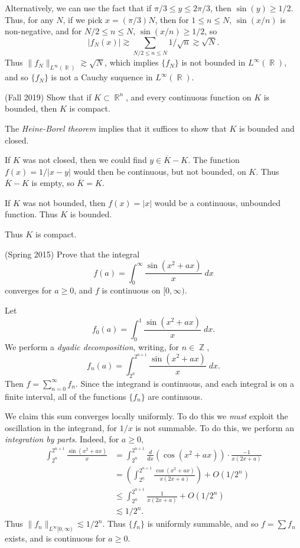 \documentclass{exam}
\DeclareMathOperator{\RR}{\mathbb{R}}
\DeclareMathOperator{\ZZ}{\mathbb{Z}}
\theoremstyle{problemstyle}
\newcommand{\1}[1]{\textbf{1}_{\left[#1\right]}} %
\begin{document}
\begin{questions}
\begin{parts}
\begin{solution}
		Alternatively, we can use the fact that if $\pi/3 \leq y \leq 2\pi/3$, then $\sin(y) \geq 1/2$. Thus, for any $N$, if we pick $x = (\pi/3)N$, then for $1 \leq n \leq N$, $\sin(x/n)$ is non-negative, and for $N/2 \leq n \leq N$, $\sin(x/n) \geq 1/2$, so
		\[ |f_N(x)| \gtrsim \sum_{N/2 \leq n \leq N} 1/\sqrt{n} \gtrsim \sqrt{N}. \]
		Thus $\| f_N \|_{L^\infty(\RR)} \gtrsim \sqrt{N}$, which implies $\{ f_N \}$ is not bounded in $L^\infty(\RR)$, and so $\{ f_N \}$ is not a Cauchy suquence in $L^\infty(\RR)$.
	\end{solution}
\end{parts}

\question (Fall 2019) Show that if $K \subset \RR^n$, and every continuous function on $K$ is bounded, then $K$ is compact.
\begin{solution}
	The \emph{Heine-Borel theorem} implies that it suffices to show that $K$ is bounded and closed.

	If $K$ was not closed, then we could find $y \in \overline{K} - K$. The function $f(x) = 1/|x-y|$ would then be continuous, but not bounded, on $K$. Thus $\overline{K} - K$ is empty, so $\overline{K} = K$.

	If $K$ was not bounded, then $f(x) = |x|$ would be a continuous, unbounded function. Thus $K$ is bounded.

	Thus $K$ is compact.
\end{solution}

\question (Spring 2015) Prove that the integral
%
\[ f(a) = \int_0^\infty \frac{\sin(x^2 + ax)}{x}\; dx \]
%
converges for $a \geq 0$, and $f$ is continuous on $[0,\infty)$.
\begin{solution}
	Let
	\[ f_0(a) = \int_0^1 \frac{\sin(x^2 + ax)}{x}\; dx. \]
	We perform a \emph{dyadic decomposition}, writing, for $n \in \ZZ$,
	\[ f_n(a) = \int_{2^n}^{2^{n+1}} \frac{\sin(x^2 + ax)}{x}\; dx. \]
	Then $f = \sum_{n = 0}^\infty f_n$. Since the integrand is continuous, and each integral is on a finite interval, all of the functions $\{ f_n \}$ are continuous.

	We claim this sum converges locally uniformly. To do this we \emph{must} exploit the oscillation in the integrand, for $1/x$ is not summable. To do this, we perform an \emph{integration by parts}. Indeed, for $a \geq 0$,
	\begin{align*}
		\int_{2^n}^{2^{n+1}} \frac{\sin(x^2 + ax)}{x} &= \int_{2^n}^{2^{n+1}} \frac{d}{dx} \left( \cos(x^2 + ax) \right) \cdot \frac{-1}{x(2x + a)}\\
		&= \left( \int_{2^n}^{2^{n+1}} \frac{\cos(x^2 + ax)}{x(2x + a)} \right) + O(1/2^n)\\
		&\leq \int_{2^n}^{2^{n+1}} \frac{1}{x(2x + a)} + O(1/2^n)\\
		&\lesssim 1/2^n.
	\end{align*}
	Thus $\| f_n \|_{L^\infty[0,\infty)} \lesssim 1/2^n$. Thus $\{ f_n \}$ is uniformly summable, and so $f = \sum f_n$ exists, and is continuous for $a \geq 0$.


\end{solution}
\end{questions}
\end{document}
